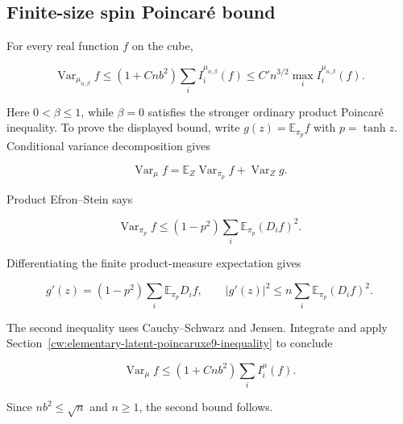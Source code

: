 \subsection{Finite-size spin Poincaré bound}\label{cw:finite-n-spin-poincaruxe9-bound-uniform-in-betale1}

For every real function $f$ on the cube,

\[
\boxed{\operatorname{Var}_{\mu_{n,\beta}}f
\le(1+Cnb^2)\sum_i I_i^{\mu_{n,\beta}}(f)
\le C'n^{3/2}\max_i I_i^{\mu_{n,\beta}}(f).}
\]

Here \(0<\beta\le1\), while \(\beta=0\) satisfies the stronger ordinary product Poincaré inequality. To prove the displayed bound, write \(g(z)=\mathbb E_{\pi_p}f\) with \(p=\tanh z\). Conditional variance decomposition gives

\[
\operatorname{Var}_{\mu}f
=\mathbb E_Z\operatorname{Var}_{\pi_p}f+\operatorname{Var}_Zg.
\]

Product Efron--Stein says

\[
\operatorname{Var}_{\pi_p}f\le(1-p^2)\sum_i\mathbb E_{\pi_p}(D_if)^2.
\]

Differentiating the finite product-measure expectation gives

\[
g'(z)=(1-p^2)\sum_i\mathbb E_{\pi_p}D_if,
\qquad
|g'(z)|^2\le n\sum_i\mathbb E_{\pi_p}(D_if)^2.
\]

The second inequality uses Cauchy--Schwarz and Jensen. Integrate and apply Section~\ref{cw:elementary-latent-poincaruxe9-inequality} to conclude

\[
\operatorname{Var}_{\mu}f\le(1+Cnb^2)\sum_i I_i^{\mu}(f).
\]

Since \(nb^2\le\sqrt n\) and \(n\ge1\), the second bound follows.
